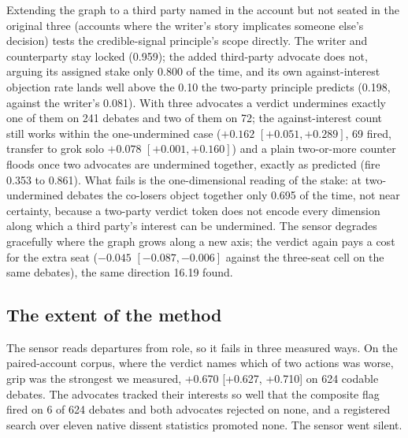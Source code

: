 Extending the graph to a third party named in the account but not seated
in the original three (accounts where the writer's story implicates
someone else's decision) tests the credible-signal principle's scope
directly. The writer and counterparty stay locked (0.959); the added
third-party advocate does not, arguing its assigned stake only 0.800 of
the time, and its own against-interest objection rate lands well above
the 0.10 the two-party principle predicts (0.198, against the writer's
0.081). With three advocates a verdict undermines exactly one of them on
241 debates and two of them on 72; the against-interest count still works
within the one-undermined case ($+0.162$ $[+0.051, +0.289]$, 69 fired,
transfer to grok solo $+0.078$ $[+0.001, +0.160]$) and a plain two-or-more
counter floods once two advocates are undermined together, exactly as
predicted (fire 0.353 to 0.861).
What fails is the one-dimensional reading of the stake: at two-undermined
debates the co-losers object together only 0.695 of the time, not near
certainty, because a two-party verdict token does not encode every
dimension along which a third party's interest can be undermined. The
sensor degrades gracefully where the graph grows along a new axis; the
verdict again pays a cost for the extra seat ($-0.045$ $[-0.087, -0.006]$
against the three-seat cell on the same debates), the same direction 16.19
found.

\subsection{The extent of the method}
\label{sec-results-extent}

The sensor reads departures from role, so it fails in three measured ways. On
the paired-account corpus, where the verdict names which of two actions was
worse, grip was the strongest we measured, +0.670 [+0.627, +0.710] on
624 codable debates. %
The advocates tracked their interests so well that the composite flag fired
on 6 of 624 debates and both advocates rejected on none, %
and a registered search over eleven native dissent statistics promoted
none. %
The sensor went silent.

